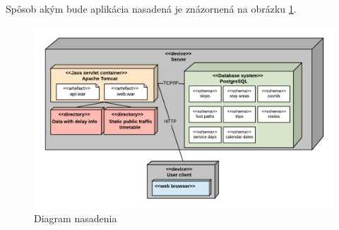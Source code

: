 Spôsob akým bude aplikácia nasadená je znázornená na obrázku \ref{fig:deploymentDiagram}.

\begin{figure}[H]
\centerline{\includegraphics[width=1.1\textwidth]{images/deployment-diagram}}
\caption[Diagram nasadenia]{Diagram nasadenia}
\label{fig:deploymentDiagram}
\end{figure}



